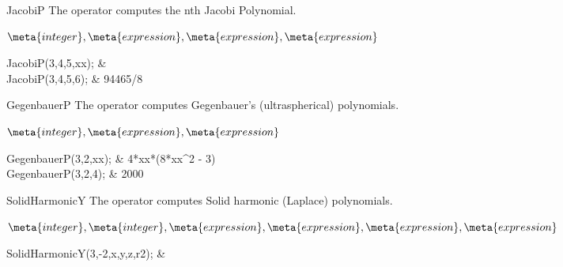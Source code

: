 \begin{Operator}{JacobiP}
The  operator computes the nth Jacobi Polynomial.

\begin{Syntax}
\(\meta{integer},\meta{expression},\meta{expression},
   \meta{expression}\)
\end{Syntax}

\begin{Examples}
JacobiP(3,4,5,xx);      & \\

JacobiP(3,4,5,6);       &       94465/8
\end{Examples}

\end{Operator}

\begin{Operator}{GegenbauerP}
The  operator computes Gegenbauer's (ultraspherical)
polynomials.

\begin{Syntax}
\(\meta{integer},\meta{expression},\meta{expression}\)
\end{Syntax}

\begin{Examples}
GegenbauerP(3,2,xx);              &       4*xx*(8*xx^2  - 3)\\

GegenbauerP(3,2,4);               &       2000
\end{Examples}

\end{Operator}

\begin{Operator}{SolidHarmonicY}
The  operator computes Solid harmonic (Laplace)
polynomials.

\begin{Syntax}

\(\meta{integer},\meta{integer},
\meta{expression},\meta{expression},\meta{expression},\meta{expression}\)

\end{Syntax}

\begin{Examples}

SolidHarmonicY(3,-2,x,y,z,r2); &

\\

\end{Examples}

\end{Operator}

